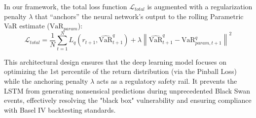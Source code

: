 In our framework, the total loss function $\mathcal{L}_{total}$ is augmented with a regularization penalty $\lambda$ that ``anchors'' the neural network's output to the rolling Parametric VaR estimate ($\text{VaR}_{param}$):
\begin{equation}
    \mathcal{L}_{total} = \frac{1}{N} \sum_{t=1}^{N} L_q(r_{t+1}, \widehat{\text{VaR}}_{t+1}^q) + \lambda \left\| \widehat{\text{VaR}}_{t+1}^q - \text{VaR}_{param, t+1}^q \right\|^2
\end{equation}

This architectural design ensures that the deep learning model focuses on optimizing the 1st percentile of the return distribution (via the Pinball Loss) while the anchoring penalty $\lambda$ acts as a regulatory safety rail. It prevents the LSTM from generating nonsensical predictions during unprecedented Black Swan events, effectively resolving the "black box" vulnerability and ensuring compliance with Basel IV backtesting standards.